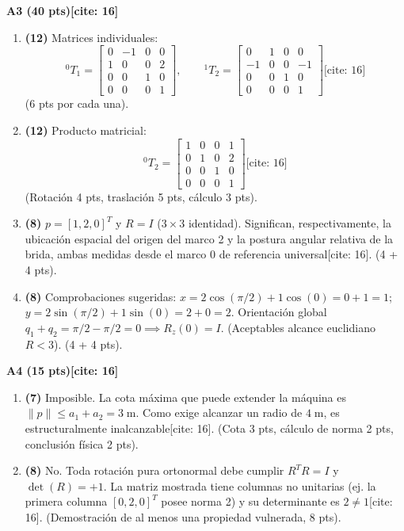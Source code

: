 \documentclass[11pt, a4paper]{article}
\begin{document}
\textbf{A3 (40 pts)[cite: 16]}
\begin{enumerate}\footnotesize
    \item \textbf{(12)} Matrices individuales:
    \begin{equation*}
        {}^0T_1 = \begin{bmatrix} 0 & -1 & 0 & 0 \\ 1 & 0 & 0 & 2 \\ 0 & 0 & 1 & 0 \\ 0 & 0 & 0 & 1 \end{bmatrix}, \qquad {}^1T_2 = \begin{bmatrix} 0 & 1 & 0 & 0 \\ -1 & 0 & 0 & -1 \\ 0 & 0 & 1 & 0 \\ 0 & 0 & 0 & 1 \end{bmatrix} \text{[cite: 16]}
    \end{equation*}
    (6 pts por cada una).
    \item \textbf{(12)} Producto matricial:
    \begin{equation*}
        {}^0T_2 = \begin{bmatrix} 1 & 0 & 0 & 1 \\ 0 & 1 & 0 & 2 \\ 0 & 0 & 1 & 0 \\ 0 & 0 & 0 & 1 \end{bmatrix} \text{[cite: 16]}
    \end{equation*}
    (Rotación 4 pts, traslación 5 pts, cálculo 3 pts).
    \item \textbf{(8)} $p = [1, 2, 0]^T$ y $R = I$ ($3 \times 3$ identidad). Significan, respectivamente, la ubicación espacial del origen del marco 2 y la postura angular relativa de la brida, ambas medidas desde el marco 0 de referencia universal[cite: 16]. (4 + 4 pts).
    \item \textbf{(8)} Comprobaciones sugeridas: $x = 2\cos(\pi/2) + 1\cos(0) = 0 + 1 = 1$; $y = 2\sin(\pi/2) + 1\sin(0) = 2 + 0 = 2$. Orientación global $q_1+q_2 = \pi/2 - \pi/2 = 0 \implies R_z(0) = I$. (Aceptables alcance euclidiano $R < 3$). (4 + 4 pts).
\end{enumerate}

\textbf{A4 (15 pts)[cite: 16]}
\begin{enumerate}\footnotesize
    \item \textbf{(7)} Imposible. La cota máxima que puede extender la máquina es $\|p\| \le a_1 + a_2 = 3\;\mathrm{m}$. Como exige alcanzar un radio de $4\;\mathrm{m}$, es estructuralmente inalcanzable[cite: 16]. (Cota 3 pts, cálculo de norma 2 pts, conclusión física 2 pts).
    \item \textbf{(8)} No. Toda rotación pura ortonormal debe cumplir $R^T R = I$ y $\det(R) = +1$. La matriz mostrada tiene columnas no unitarias (ej. la primera columna $[0,2,0]^T$ posee norma 2) y su determinante es $2 \neq 1$[cite: 16]. (Demostración de al menos una propiedad vulnerada, 8 pts).
\end{enumerate}
\end{document}
